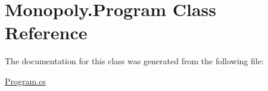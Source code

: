 \hypertarget{class_monopoly_1_1_program}{}\section{Monopoly.\+Program Class Reference}
\label{class_monopoly_1_1_program}


The documentation for this class was generated from the following file\+:\begin{DoxyCompactItemize}
\item 
\mbox{\hyperlink{_program_8cs}{Program.\+cs}}\end{DoxyCompactItemize}
